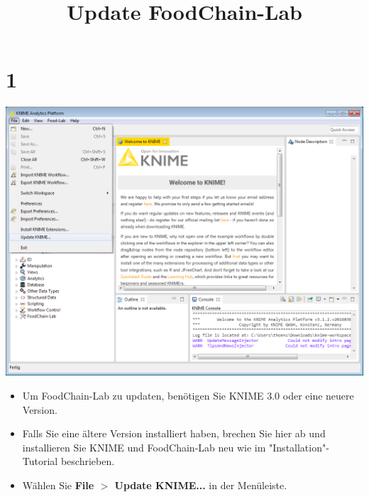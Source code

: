 \documentclass{beamer}
\title{Update FoodChain-Lab}
\date{}
\begin{document}
\maketitle

\section{1}
\begin{frame}
	\begin{center}
  		\includegraphics[height=0.6\textheight]{1.png}
	\end{center}
	\begin{itemize}
		\item Um FoodChain-Lab zu updaten, benötigen Sie KNIME 3.0 oder eine neuere Version.
		\item Falls Sie eine ältere Version installiert haben, brechen Sie hier ab und installieren Sie KNIME und FoodChain-Lab neu wie im "Installation"-Tutorial beschrieben. 
		\item Wählen Sie \textbf{File $>$ Update KNIME...} in der Menüleiste.
	\end{itemize}
\end{frame}
\end{document}
